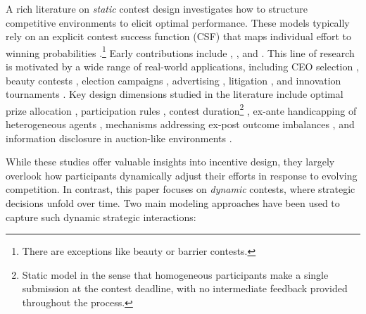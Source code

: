 \documentclass[mnsc]{informs3}
\begin{document}
A rich literature on \textit{static} contest design \citep{Ales2017Contest} investigates how to structure competitive environments to elicit optimal performance. 
These models typically rely on an explicit contest success function (CSF) that maps individual effort to winning probabilities \citep{skaperdas1996contest}.\footnote{There are exceptions like beauty or barrier contests.} 
Early contributions include \citet{Tullock1980}, \citet{Lazear1981tournaments}, and \citet{nalebuff1983Competition}. 
This line of research is motivated by a wide range of real-world applications, including CEO selection \citep{tsoulouhas2006ceo}, beauty contests \citep{morris2002social}, election campaigns \citep{denter2020campaign}, advertising \citep{dockner2018Advertising}, litigation \citep{baik2007litigation, park2022litigation}, and innovation tournaments \citep{chen2021DataSharing}.
Key design dimensions studied in the literature include optimal prize allocation \citep{moldovanu2001optimal, ales2017optimal_award}, participation rules \citep{Ales2021Innovation, stouras2022role}, contest duration\footnote{Static model in the sense that homogeneous participants make a single submission at the contest deadline, with no intermediate feedback provided throughout the process.} \citep{korpeoglu2021duration}, ex-ante handicapping of heterogeneous agents \citep{tsoulouhas2006ceo, kirkegaard2012favoritism, syam2013sales}, mechanisms addressing ex-post outcome imbalances \citep{Imhof2016Ex_post}, and information disclosure in auction-like environments \citep{bergemann2022optimal, antsygina2023optimal}. 


While these studies offer valuable insights into incentive design, they largely overlook how participants dynamically adjust their efforts in response to evolving competition.
In contrast, this paper focuses on \textit{dynamic} contests, where strategic decisions unfold over time.
Two main modeling approaches have been used to capture such dynamic strategic interactions:
\end{document}

